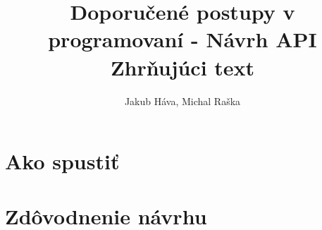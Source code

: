 \documentclass{article}
\title{\vspace{30mm}Doporučené postupy v programovaní - Návrh API\\Zhrňujúci text}
\author{Jakub Háva, Michal Raška}
\date{}
\begin{document}
\maketitle
\thispagestyle{empty}

\clearpage
\tableofcontents

\clearpage
\section{Ako spustiť}
\section{Zdôvodnenie návrhu}
\end{document}
